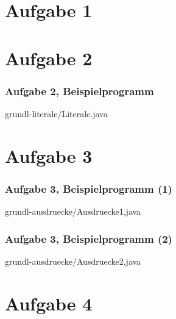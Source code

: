 \documentclass[9pt,german]{beamer}%
\begin{document}
\section{Aufgabe 1}



\section{Aufgabe 2}



\begin{frame}[t]%
  \frametitle{Aufgabe 2, Beispielprogramm}%
\medskip


{grundl-literale/Literale.java}
\end{frame}

\section{Aufgabe 3}


\begin{frame}[t]%
  \frametitle{Aufgabe 3, Beispielprogramm (1)}%
\medskip


{grundl-ausdruecke/Ausdruecke1.java}
\end{frame}


\begin{frame}[t]%
  \frametitle{Aufgabe 3, Beispielprogramm (2)}%
\medskip


{grundl-ausdruecke/Ausdruecke2.java}
\end{frame}


\section{Aufgabe 4}

\end{document}
